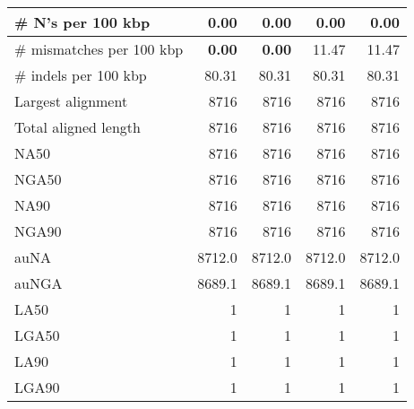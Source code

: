 \documentclass[12pt,a4paper]{article}
\begin{document}
\begin{table}[ht]
\begin{center}
\begin{tabular}{|l*{4}{|r}|}
\# N's per 100 kbp & 0.00 & 0.00 & 0.00 & 0.00 \\ \hline
\# mismatches per 100 kbp & {\bf 0.00} & {\bf 0.00} & 11.47 & 11.47 \\ \hline
\# indels per 100 kbp & 80.31 & 80.31 & 80.31 & 80.31 \\ \hline
Largest alignment & 8716 & 8716 & 8716 & 8716 \\ \hline
Total aligned length & 8716 & 8716 & 8716 & 8716 \\ \hline
NA50 & 8716 & 8716 & 8716 & 8716 \\ \hline
NGA50 & 8716 & 8716 & 8716 & 8716 \\ \hline
NA90 & 8716 & 8716 & 8716 & 8716 \\ \hline
NGA90 & 8716 & 8716 & 8716 & 8716 \\ \hline
auNA & 8712.0 & 8712.0 & 8712.0 & 8712.0 \\ \hline
auNGA & 8689.1 & 8689.1 & 8689.1 & 8689.1 \\ \hline
LA50 & 1 & 1 & 1 & 1 \\ \hline
LGA50 & 1 & 1 & 1 & 1 \\ \hline
LA90 & 1 & 1 & 1 & 1 \\ \hline
LGA90 & 1 & 1 & 1 & 1 \\ \hline
\end{tabular}
\end{center}
\end{table}
\end{document}
